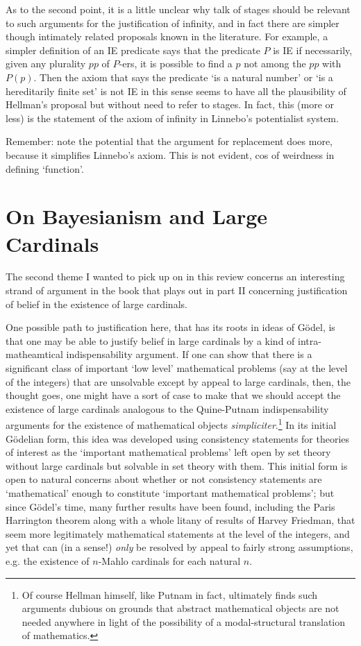 \documentclass{asl}
\theoremstyle{definition}
\begin{document}
As to the second point, it is a little unclear why talk of stages 
should be relevant to such arguments for the justification of infinity, 
and in fact there are simpler though intimately related proposals known 
in the literature. For example, a simpler definition of an IE predicate says 
that the predicate $P$ is IE if necessarily, given any plurality $pp$ of $P$-ers, 
it is possible to find a $p$ not among the $pp$ with $P(p)$. 
Then the axiom that says the predicate `is a natural number' or 
`is a hereditarily finite set' is not IE in this sense seems to have 
all the plausibility of Hellman's proposal but without need to refer to stages. 
In fact, this (more or less) is the statement of the axiom of infinity in 
Linnebo's potentialist system.

Remember: note the potential that the argument for replacement does more,
because it simplifies Linnebo's axiom. This is not evident, 
cos of weirdness in defining `function'.

\section{On Bayesianism and Large Cardinals}

The second theme I wanted to pick up on in this review concerns an interesting
strand of argument in the book that plays out in part II concerning justification
of belief in the existence of large cardinals. 

One possible path to justification here, that has its roots in ideas of G\"odel, 
is that one may be able to justify belief in large cardinals by 
a kind of intra-matheamtical indispensability argument. If one can show that there
is a significant class of important `low level' mathematical problems 
(say at the level of the integers) that are unsolvable except
by appeal to large cardinals, then, the thought goes, one might have a sort of 
case to make that we should accept the existence of large cardinals
analogous to the Quine-Putnam indispensability arguments for the existence 
of mathematical objects \emph{simpliciter}.\footnote{
    Of course Hellman himself, like Putnam in fact, 
    ultimately finds such arguments dubious on grounds 
    that abstract mathematical objects are not needed anywhere
    in light of the possibility of a modal-structural translation 
    of mathematics.
} 
In its initial G\"odelian form, this idea was developed using consistency statements 
for theories of interest as the `important mathematical problems' left open by set theory
without large cardinals but solvable in set theory with them. This initial form is 
open to natural concerns about whether or not consistency statements are `mathematical'
enough to constitute `important mathematical problems'; but since G\"odel's time,
many further results have been found, including the Paris Harrington theorem 
along with a whole litany of results of Harvey Friedman, that seem more 
legitimately mathematical statements at the level of the integers, and yet
that can (in a sense!) \emph{only} be resolved by appeal to fairly strong assumptions, 
e.g. the existence of $n$-Mahlo cardinals for each natural $n$.
\end{document}
